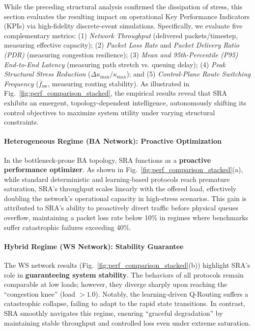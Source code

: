 \documentclass[journal]{IEEEtran}
\theoremstyle{plain}
\theoremstyle{definition}
\newcommand{\rev}[1]{{\color{blue}#1}}
\begin{document}
While the preceding structural analysis confirmed the dissipation of stress, this section evaluates the resulting impact on operational Key Performance Indicators (KPIs) via high-fidelity discrete-event simulations. 
\rev{Specifically, we evaluate five complementary metrics: (1) \textit{Network Throughput} (delivered packets/timestep, measuring effective capacity); (2) \textit{Packet Loss Rate} and \textit{Packet Delivery Ratio (PDR)} (measuring congestion resilience); (3) \textit{Mean and 95th-Percentile (P95) End-to-End Latency} (measuring path stretch vs. queuing delay); (4) \textit{Peak Structural Stress Reduction} ($\Delta \kappa_{\max}/\kappa_{\max}$); and (5) \textit{Control-Plane Route Switching Frequency} ($\bar{f}_{\text{sw}}$, measuring routing stability).}
As illustrated in Fig.~\ref{fig:perf_comparison_stacked}, the empirical results reveal that SRA exhibits an emergent, topology-dependent intelligence, autonomously shifting its control objectives to maximize system utility under varying structural constraints.

\paragraph{Heterogeneous Regime (BA Network): Proactive Optimization}
In the bottleneck-prone BA topology, SRA functions as a \textbf{proactive performance optimizer}. 
As shown in Fig.~\ref{fig:perf_comparison_stacked}(a), while standard deterministic and learning-based protocols reach premature saturation, SRA's throughput scales linearly with the offered load, effectively doubling the network's operational capacity in high-stress scenarios. 
This gain is attributed to SRA's ability to proactively divert traffic before physical queues overflow, maintaining a packet loss rate below 10\% in regimes where benchmarks suffer catastrophic failures exceeding 40\%.

\paragraph{Hybrid Regime (WS Network): Stability Guarantee}
The WS network results (Fig.~\ref{fig:perf_comparison_stacked}(b)) highlight SRA's role in \textbf{guaranteeing system stability}. 
The behaviors of all protocols remain comparable at low loads; however, they diverge sharply upon reaching the ``congestion knee'' (load $> 1.0$). 
Notably, the learning-driven Q-Routing suffers a catastrophic collapse, failing to adapt to the rapid state transitions. 
In contrast, SRA smoothly navigates this regime, ensuring ``graceful degradation'' by maintaining stable throughput and controlled loss even under extreme saturation.
\end{document}
